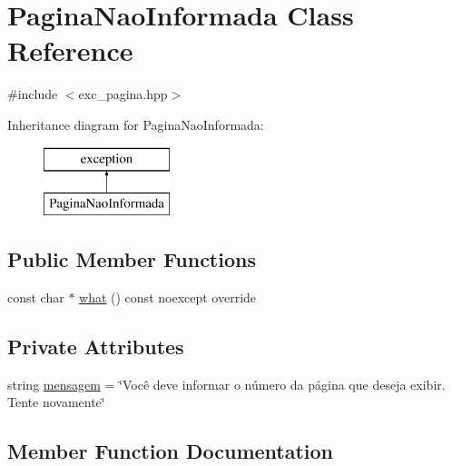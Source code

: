 \hypertarget{classPaginaNaoInformada}{}\section{Pagina\+Nao\+Informada Class Reference}
\label{classPaginaNaoInformada}


{\ttfamily \#include $<$exc\+\_\+pagina.\+hpp$>$}

Inheritance diagram for Pagina\+Nao\+Informada\+:\begin{figure}[H]
\begin{center}
\leavevmode
\includegraphics[height=2.000000cm]{classPaginaNaoInformada}
\end{center}
\end{figure}
\subsection*{Public Member Functions}
\begin{DoxyCompactItemize}
\item 
const char $\ast$ \hyperlink{classPaginaNaoInformada_a82d391c70c1e60f988448eac2b22571a}{what} () const noexcept override
\end{DoxyCompactItemize}
\subsection*{Private Attributes}
\begin{DoxyCompactItemize}
\item 
string \hyperlink{classPaginaNaoInformada_ac24c6f91d5c86702424530c6b0fba7ec}{mensagem} = \char`\"{}Você deve informar o número da página que deseja exibir. Tente novamente\char`\"{}
\end{DoxyCompactItemize}


\subsection{Member Function Documentation}
\mbox{\label{classPaginaNaoInformada_a82d391c70c1e60f988448eac2b22571a}} 
